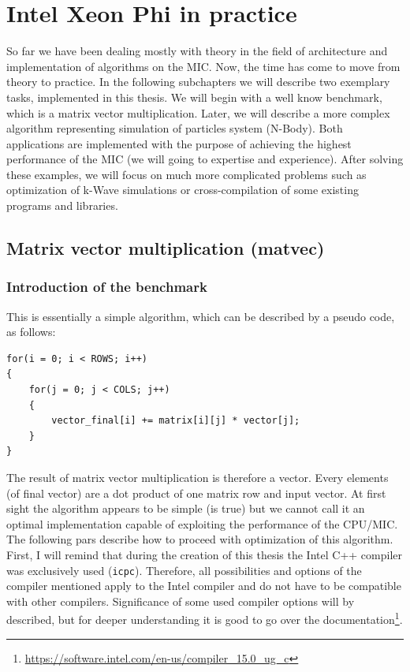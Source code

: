 \chapter{Intel Xeon Phi in practice}
So far we have been dealing mostly with theory in the field of architecture and implementation of algorithms on the MIC. Now, the time has come to move from theory to practice. In the following subchapters we will describe two exemplary tasks, implemented in this thesis. We will begin with a well know benchmark, which is a matrix vector multiplication. Later, we will describe a more complex algorithm representing simulation of particles system (N-Body). Both applications are implemented with the purpose of achieving the highest performance of the MIC (we will going to expertise and experience). After solving these examples, we will focus on much more complicated problems such as optimization of k-Wave simulations or cross-compilation of some existing programs and libraries.

\section{Matrix vector multiplication (matvec)}

\subsection{Introduction of the benchmark}
\label{sec:matvec_intro}
This is essentially a simple algorithm, which can be described by a pseudo code, as follows:

\bigskip
\begin{lstlisting}[caption=Matrix vector multiplication pseudo code., captionpos=b, label=code_matvec]
for(i = 0; i < ROWS; i++)
{
    for(j = 0; j < COLS; j++)
    {
        vector_final[i] += matrix[i][j] * vector[j];
    }
}
\end{lstlisting}
\bigskip


The result of matrix vector multiplication is therefore a vector. Every elements (of final vector) are a dot product of one matrix row and input vector. At first sight the algorithm appears to be simple (is true) but we cannot call it an optimal implementation capable of exploiting the performance of the CPU/MIC. The following pars describe how to proceed with optimization of this algorithm. First, I will remind that during the creation of this thesis the Intel C++ compiler was exclusively used (\texttt{icpc}). Therefore, all possibilities and options of the compiler mentioned apply to the Intel compiler and do not have to be compatible with other compilers. Significance of some used compiler options will by described, but for deeper understanding it is good to go over the documentation\footnote{\url{https://software.intel.com/en-us/compiler_15.0_ug_c}}.

